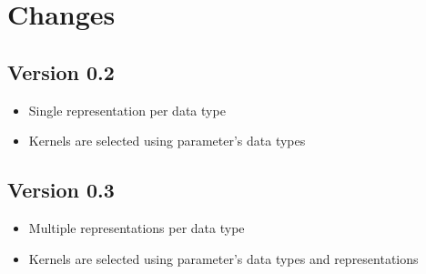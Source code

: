 \chapter{Changes}

\section{Version 0.2}

\begin{itemize}
  \item Single representation per data type
  \item Kernels are selected using parameter's data types
\end{itemize}


\section{Version 0.3}

\begin{itemize}
  \item Multiple representations per data type
  \item Kernels are selected using parameter's data types and representations
\end{itemize}
